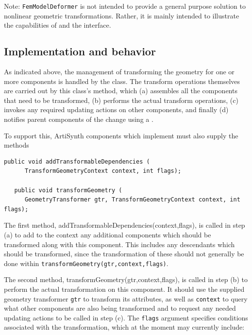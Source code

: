 \begin{sideblock}
Note: {\tt FemModelDeformer} is not intended to provide a general
purpose solution to nonlinear geometric transformations. Rather, it
is mainly intended to illustrate the capabilities of
 and the
 interface.
\end{sideblock}

\subsection{Implementation and behavior}

As indicated above, the management of transforming the geometry for one
or more components is handled by the
 class.
The transform operations themselves are carried out by this class's
method, which (a) assembles all the components that need
to be transformed, (b) performs the actual transform operations,
(c) invokes any required updating actions on other components,
and finally (d) notifies parent components of the change using
a .

To support this, ArtiSynth components which implement
must also supply the methods
%
\begin{lstlisting}[]
   public void addTransformableDependencies (
      TransformGeometryContext context, int flags);

   public void transformGeometry (
      GeometryTransformer gtr, TransformGeometryContext context, int flags);
\end{lstlisting}
%
The first method,
%
{addTransformableDependencies(context,flags)}, 
is called in step (a) to add to the context any additional components
which should be transformed along with this component. This includes
any descendants which should be transformed, since the
transformation of these should not generally be done within\pdfbreak
{\tt transformGeometry(gtr,context,flags)}.

The second method, 
%
{transformGeometry(gtr,context,flags)}, is
called in step (b) to perform the actual transformation on this
component.  It should use the supplied geometry transformer {\tt gtr}
to transform its attributes, as well as {\tt context} to query what
other components are also being transformed and to request
any needed updating actions to be called in step (c).  The {\tt flags} argument
specifies conditions associated with the transformation, which at the
moment may currently include:

